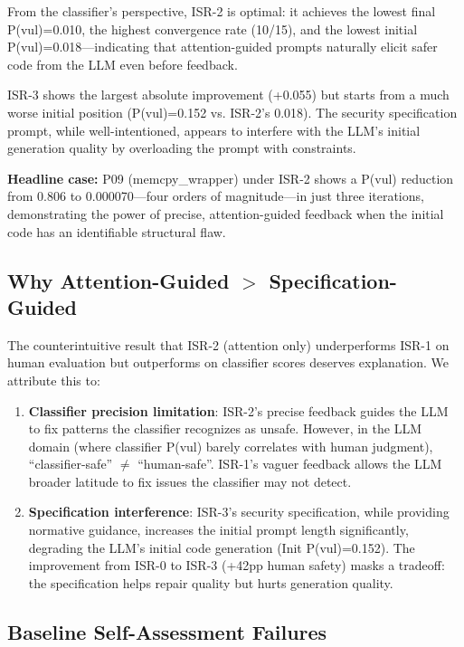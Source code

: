 \documentclass[10pt,conference]{IEEEtran}
\begin{document}
From the classifier's perspective, ISR-2 is optimal: it achieves the lowest final P(vul)=0.010, the highest convergence rate (10/15), and the lowest initial P(vul)=0.018---indicating that attention-guided prompts naturally elicit safer code from the LLM even before feedback.

ISR-3 shows the largest absolute improvement (+0.055) but starts from a much worse initial position (P(vul)=0.152 vs. ISR-2's 0.018). The security specification prompt, while well-intentioned, appears to interfere with the LLM's initial generation quality by overloading the prompt with constraints.

\textbf{Headline case:} P09 (memcpy\_wrapper) under ISR-2 shows a P(vul) reduction from 0.806 to 0.000070---four orders of magnitude---in just three iterations, demonstrating the power of precise, attention-guided feedback when the initial code has an identifiable structural flaw.

\subsection{Why Attention-Guided $>$ Specification-Guided}

The counterintuitive result that ISR-2 (attention only) underperforms ISR-1 on human evaluation but outperforms on classifier scores deserves explanation. We attribute this to:

\begin{enumerate}
\item \textbf{Classifier precision limitation}: ISR-2's precise feedback guides the LLM to fix patterns the classifier recognizes as unsafe. However, in the LLM domain (where classifier P(vul) barely correlates with human judgment), ``classifier-safe'' $\neq$ ``human-safe''. ISR-1's vaguer feedback allows the LLM broader latitude to fix issues the classifier may not detect.

\item \textbf{Specification interference}: ISR-3's security specification, while providing normative guidance, increases the initial prompt length significantly, degrading the LLM's initial code generation (Init P(vul)=0.152). The improvement from ISR-0 to ISR-3 (+42pp human safety) masks a tradeoff: the specification helps repair quality but hurts generation quality.
\end{enumerate}

\subsection{Baseline Self-Assessment Failures}
\end{document}

